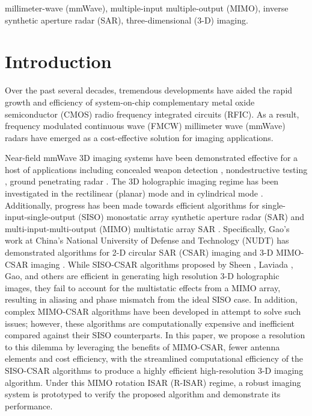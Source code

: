 \documentclass[conference]{IEEEtran}
\begin{document}
		\begin{IEEEkeywords}
			millimeter-wave (mmWave), multiple-input multiple-output (MIMO), inverse synthetic aperture radar (SAR), three-dimensional (3-D) imaging.
		\end{IEEEkeywords}
		
		
		\section{Introduction}
		\label{sec:introduction}
		Over the past several decades, tremendous developments have aided the rapid growth and efficiency of system-on-chip complementary metal oxide semiconductor (CMOS) radio frequency integrated circuits (RFIC). As a result, frequency modulated continuous wave (FMCW) millimeter wave (mmWave) radars have emerged as a cost-effective solution for imaging applications.
		
		Near-field mmWave 3D imaging systems have been demonstrated effective for a host of applications including concealed weapon detection \cite{Sheen:ConcealedWeaponDectection,Zhuge:ConcealedWeaponDectection,Yanik:ConcealedItemImaging}, nondestructive testing \cite{Zhuge:NondestructiveTesting,Baccouche:NondestructiveTesting}, ground penetrating radar \cite{Liu:GPR}. The 3D holographic imaging regime has been investigated in the rectilinear (planar) mode \cite{Yanik:MillimeterWaveNearFieldImaging,Qiao:PlanarSAR} and in cylindrical mode \cite{Sheen:NearField3DRadarImaging}. Additionally, progress has been made towards efficient algorithms for single-input-single-output (SISO) monostatic array synthetic aperture radar (SAR) \cite{Sheen:3DmmWaveImagingSISO} and multi-input-multi-output (MIMO) multistatic array SAR \cite{Zhuge:3DmmWaveImagingMIMO}. Specifically, Gao's work at China's National University of Defense and Technology (NUDT) has demonstrated algorithms for 2-D circular SAR (CSAR) imaging \cite{Gao:CSAR2D} and 3-D MIMO-CSAR imaging \cite{Gao:EfficientAlgorithmMIMOCylindrical}. While SISO-CSAR algorithms proposed by Sheen \cite{Sheen:CSARPatent}, Laviada \cite{Laviada:ECSAR}, Gao, and others are efficient in generating high resolution 3-D holographic images, they fail to account for the multistatic effects from a MIMO array, resulting in aliasing and phase mismatch from the ideal SISO case. In addition, complex MIMO-CSAR algorithms have been developed in attempt to solve such issues; however, these algorithms are computationally expensive and inefficient compared against their SISO counterparts. In this paper, we propose a resolution to this dilemma by leveraging the benefits of MIMO-CSAR, fewer antenna elements and cost efficiency, with the streamlined computational efficiency of the SISO-CSAR algorithms to produce a highly efficient high-resolution 3-D imaging algorithm. Under this MIMO rotation ISAR (R-ISAR) regime, a robust imaging system is prototyped to verify the proposed algorithm and demonstrate its performance.
		
\end{document}
